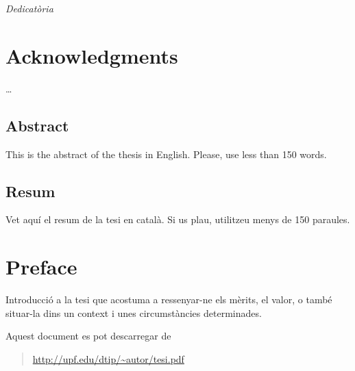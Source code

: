 \documentclass[10pt,b5paper,twoside,showtrims,openright]{memoir}
\begin{document}
\frontmatter

\cleartorecto %


\thispagestyle{empty}
\begin{flushright}
  \LARGE
  \itshape
Dedicatòria
\end{flushright}

\cleartorecto

\chapter*{Acknowledgments}
\ldots

\cleartorecto
\cleartorecto
\thispagestyle{chapter}
\section*{Abstract}
This is the abstract of the thesis in English.  Please, use less
than 150 words.

\vspace*{\fill}
\section*{Resum}
Vet aquí el resum de la tesi en català.  Si us plau, utilitzeu
menys de 150 paraules.
\vspace*{\fill}

\cleartorecto

\pagestyle{headings}
\chapter{Preface}
Introducció a la tesi que acostuma a ressenyar-ne els mèrits, el
valor, o també situar-la dins un context i unes circumstàncies
determinades.

\vspace{1cm}
Aquest document es pot descarregar de
\begin{quotation}
\url{http://upf.edu/dtip/~autor/tesi.pdf}
\end{quotation}
\cleartorecto
\end{document}
